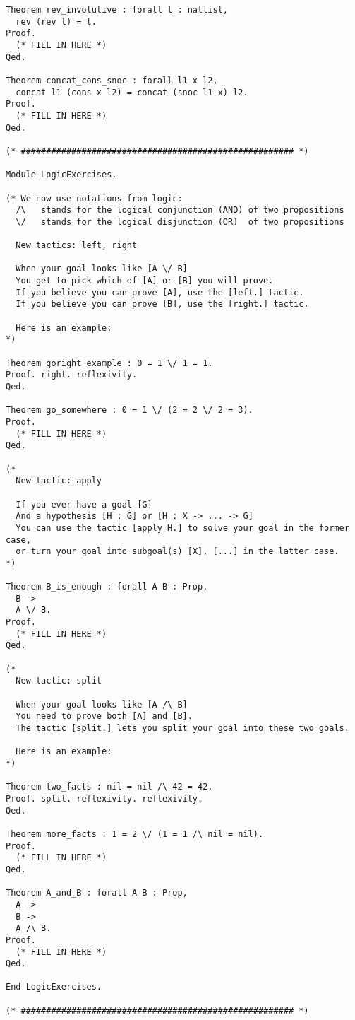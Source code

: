 \begin{verbatim}
Theorem rev_involutive : forall l : natlist,
  rev (rev l) = l.
Proof.
  (* FILL IN HERE *)
Qed.

Theorem concat_cons_snoc : forall l1 x l2,
  concat l1 (cons x l2) = concat (snoc l1 x) l2.
Proof.
  (* FILL IN HERE *)
Qed.

(* ###################################################### *)

Module LogicExercises.

(* We now use notations from logic:
  /\   stands for the logical conjunction (AND) of two propositions
  \/   stands for the logical disjunction (OR)  of two propositions

  New tactics: left, right

  When your goal looks like [A \/ B]
  You get to pick which of [A] or [B] you will prove.
  If you believe you can prove [A], use the [left.] tactic.
  If you believe you can prove [B], use the [right.] tactic.

  Here is an example:
*)

Theorem goright_example : 0 = 1 \/ 1 = 1.
Proof. right. reflexivity.
Qed.

Theorem go_somewhere : 0 = 1 \/ (2 = 2 \/ 2 = 3).
Proof.
  (* FILL IN HERE *)
Qed.

(*
  New tactic: apply

  If you ever have a goal [G]
  And a hypothesis [H : G] or [H : X -> ... -> G]
  You can use the tactic [apply H.] to solve your goal in the former case,
  or turn your goal into subgoal(s) [X], [...] in the latter case.
*)

Theorem B_is_enough : forall A B : Prop,
  B ->
  A \/ B.
Proof.
  (* FILL IN HERE *)
Qed.

(*
  New tactic: split

  When your goal looks like [A /\ B]
  You need to prove both [A] and [B].
  The tactic [split.] lets you split your goal into these two goals.

  Here is an example:
*)

Theorem two_facts : nil = nil /\ 42 = 42.
Proof. split. reflexivity. reflexivity.
Qed.

Theorem more_facts : 1 = 2 \/ (1 = 1 /\ nil = nil).
Proof.
  (* FILL IN HERE *)
Qed.

Theorem A_and_B : forall A B : Prop,
  A ->
  B ->
  A /\ B.
Proof.
  (* FILL IN HERE *)
Qed.

End LogicExercises.

(* ###################################################### *)


\end{verbatim}

